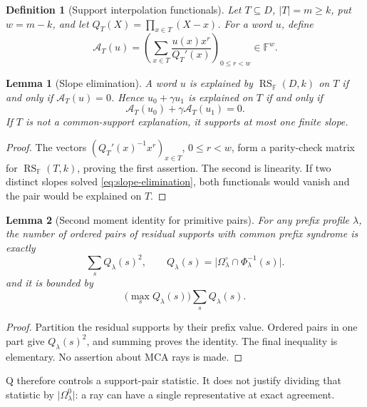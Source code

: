 \documentclass[12pt,a4paper]{amsart}
\numberwithin{equation}{section}
\newtheorem{lemma}[lemma]{Lemma}
\newtheorem{definition}[definition]{Definition}
\theoremstyle{remark}
\DeclareMathOperator{\RS}{RS}
\newcommand{\F}{\mathbb F}
\newcommand{\Omc}{\Omega^{\circ}}
\newcommand{\abs}[1]{\lvert #1\rvert}
\begin{document}
\begin{definition}[Support interpolation functionals]
\label{def:pair-to-ray-map}
Let \(T\subseteq D\), \(\abs T=m\ge k\), put \(w=m-k\), and let
\(Q_T(X)=\prod_{x\in T}(X-x)\).  For a word \(u\), define
\[
 \mathcal A_T(u)=
 \left(
   \sum_{x\in T}\frac{u(x)x^r}{Q_T'(x)}
 \right)_{0\le r<w}\in\F^w.
 \tag{12.1}\label{eq:interpolation-functional}
\]
\end{definition}

\begin{lemma}[Slope elimination]\label{lem:saturation-quotient-rays}
A word \(u\) is explained by \(\RS_\F(D,k)\) on \(T\) if and only if
\(\mathcal A_T(u)=0\).  Hence \(u_0+\gamma u_1\) is explained on \(T\)
if and only if
\[
 \mathcal A_T(u_0)+\gamma\mathcal A_T(u_1)=0.
 \tag{12.2}\label{eq:slope-elimination}
\]
If \(T\) is not a common-support explanation, it supports at most one
finite slope.
\end{lemma}

\begin{proof}
The vectors \((Q_T'(x)^{-1}x^r)_{x\in T}\), \(0\le r<w\), form a
parity-check matrix for \(\RS_\F(T,k)\), proving the first assertion.  The
second is linearity.  If two distinct slopes solved
\eqref{eq:slope-elimination}, both functionals would vanish and the pair
would be explained on \(T\).
\end{proof}

\begin{lemma}[Second moment identity for primitive pairs]\label{lem:second-moment-identity}
For any prefix profile \(\lambda\), the number of ordered pairs of residual
supports with common prefix syndrome is exactly
\[
        \sum_s Q_\lambda(s)^2,
        \qquad
        Q_\lambda(s)=\abs{\Omc_\lambda\cap\Phi_\lambda^{-1}(s)}.
\]
and it is bounded by
\[
        \bigl(\max_sQ_\lambda(s)\bigr)\sum_sQ_\lambda(s).
\]
\end{lemma}

\begin{proof}
Partition the residual supports by their prefix value.  Ordered pairs in one
part give \(Q_\lambda(s)^2\), and summing proves the identity.  The final
inequality is elementary.  No assertion about MCA rays is made.
\end{proof}

Q therefore controls a support-pair statistic.  It does not justify dividing
that statistic by \(\abs{\Omega^0_\lambda}\): a ray can have a single
representative at exact agreement.
\end{document}

